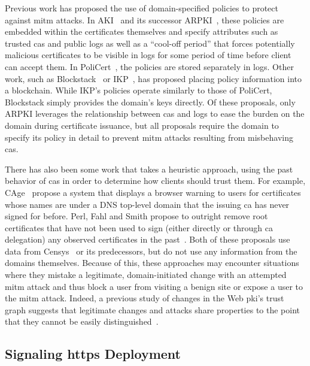 Previous work has proposed the use of domain-specified policies to protect
against \ac{mitm} attacks. In AKI~\cite{kim2013accountable} and its successor
ARPKI~\cite{basin2014arpki}, these policies are embedded within the certificates
themselves and specify attributes such as trusted \acp{ca} and public logs as
well as a ``cool-off period'' that forces potentially malicious certificates to
be visible in logs for some period of time before client can accept them. In
PoliCert~\cite{szalachowski2014policert}, the policies are stored separately in
logs. Other work, such as Blockstack~\cite{ali2016blockstack} or
IKP~\cite{matsumoto2017ikp}, has proposed placing policy information into a
blockchain. While IKP's policies operate similarly to those of PoliCert,
Blockstack simply provides the domain's keys directly. Of these proposals, only
ARPKI leverages the relationship between \acp{ca} and logs to ease the burden on
the domain during certificate issuance, but all proposals require the domain to
specify its policy in detail to prevent \ac{mitm} attacks resulting from
misbehaving \acp{ca}.

There has also been some work that takes a heuristic approach, using the past
behavior of \acp{ca} in order to determine how clients should trust them. For
example, CAge~\cite{kasten2013cage} propose a system that displays a browser
warning to users for certificates whose names are under a DNS top-level domain
that the issuing \ac{ca} has never signed for before. Perl, Fahl and Smith
propose to outright remove root certificates that have not been used to sign
(either directly or through \ac{ca} delegation) any observed certificates in the
past~\cite{perl2014you}. Both of these proposals use data from
Censys~\cite{durumeric2015search} or its predecessors, but do not use any
information from the domains themselves. Because of this, these approaches may
encounter situations where they mistake a legitimate, domain-initiated change
with an attempted \ac{mitm} attack and thus block a user from visiting a benign
site or expose a user to the \ac{mitm} attack. Indeed, a previous study of
changes in the Web \ac{pki}'s trust graph suggests that legitimate changes and
attacks share properties to the point that they cannot be easily
distinguished~\cite{amann2013no}.

\subsection{Signaling \ac{https} Deployment}
\label{sec:background:signaling}

